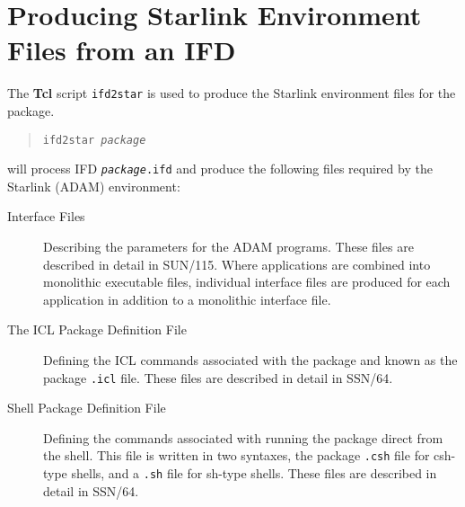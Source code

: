 \documentclass[twoside,11pt]{article}
\newcommand{\xref}[3]{#1}
\newcommand{\xlabel}[1]{}
\begin{document}
\section{\label{ifd2star}\xlabel{producing_starlink_environment_files_from_an_ifd}Producing
Starlink Environment Files from an IFD}
The \textbf{Tcl} script \texttt{ifd2star} is used to produce the Starlink
environment files for the package.
\begin{quote}
\texttt{ifd2star \textit{package}}
\end{quote}
will process IFD \texttt{\textit{package}.ifd} and produce the following files
required by the Starlink (ADAM) environment:
\begin{description}
\item[Interface Files] Describing the parameters for the ADAM programs.
These files are described in detail in
\xref{SUN/115}{sun115}{}.
Where applications are combined into monolithic executable files, individual
interface files are produced for each application in addition to a monolithic
interface file.
\item[The \xref{ICL}{sg5}{} Package Definition File] Defining the ICL commands
associated with the package and known as the package \texttt{.icl} file.
These files are described in detail in
\xref{SSN/64}{ssn64}{}.
\item[Shell Package Definition File] Defining the commands associated with
running the package direct from the shell. This file is written in two
syntaxes, the package \texttt{.csh} file for csh-type shells, and a
\texttt{.sh} file for sh-type shells.
These files are described in detail in
\xref{SSN/64}{ssn64}{}.
\end{description}
\end{document}
